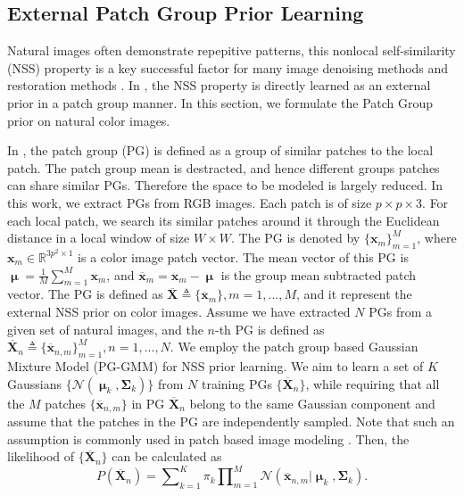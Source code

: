 \documentclass[10pt,twocolumn,letterpaper]{article}
\begin{document}
\subsection{External Patch Group Prior Learning}
Natural images often demonstrate repepitive patterns, this nonlocal self-similarity (NSS) property is a key successful factor for many image denoising methods \cite{nlm,bm3d,lssc,ncsr,wnnm,pgpd} and restoration methods \cite{}. In \cite{pgpd}, the NSS property is directly learned as an external prior in a patch group manner. In this section, we formulate the Patch Group prior on natural color images.

In \cite{pgpd}, the patch group (PG) is defined as a group of similar patches to the local patch. The patch group mean is destracted, and hence different groups patches can share similar PGs. Therefore the space to be modeled is largely reduced. In this work, we extract PGs from RGB images. Each patch is of size $p\times p \times 3$. For each local patch, we search its similar patches around it through the Euclidean distance in a local window of size $W\times W$. The PG is denoted by $\{\mathbf{x}_{m}\}_{m=1}^{M}$, where $\mathbf{x}_{m}\in \mathbb{R}^{3p^{2}\times1}$ is a color image patch vector. The mean vector of this PG is $\boldsymbol{\upmu}=\frac{1}{M}\sum_{m=1}^{M}\mathbf{x}_{m}$, and $\mathbf{\overline{x}}_{m}=\mathbf{x}_{m}-\boldsymbol{\upmu}$ is the group mean subtracted patch vector. The PG is defined as $\mathbf{\overline{X}}\triangleq \{\mathbf{\overline{x}}_{m}\}, m=1,...,M$, and it represent the external NSS prior on color images. Assume we have extracted $N$ PGs from a given set of natural images, and the $n$-th PG is defined as $\mathbf{\overline{X}}_{n}\triangleq \{\mathbf{\overline{x}}_{n,m}\}_{m=1}^{M}, n=1,...,N$. We employ the patch group based Gaussian Mixture Model (PG-GMM) for NSS prior learning. We aim to learn a set of $K$ Gaussians $\{\mathcal{N}(\boldsymbol{\upmu}_{k},\mathbf{\Sigma}_{k})\}$ from $N$ training PGs $\{\mathbf{\overline{X}}_{n}\}$, while requiring that all the $M$ patches $\{\mathbf{\overline{x}}_{n,m}\}$  in PG $\mathbf{\overline{X}}_{n}$ belong to the same Gaussian component and assume that the patches in the PG are independently sampled. Note that such an assumption is commonly used in patch based image modeling \cite{ksvd,lssc}. Then, the likelihood of $\{\mathbf{\overline{X}}_{n}\}$ can be calculated as
\begin{equation}\label{equ1}
P(\mathbf{\overline{X}}_{n})  = \sum\nolimits_{k=1}^{K}\pi_{k}\prod\nolimits_{m=1}^{M}\mathcal{N}(\mathbf{\overline{x}}_{n,m}|\boldsymbol{\upmu}_{k},\mathbf{\Sigma}_{k}).
\end{equation}
\end{document}
